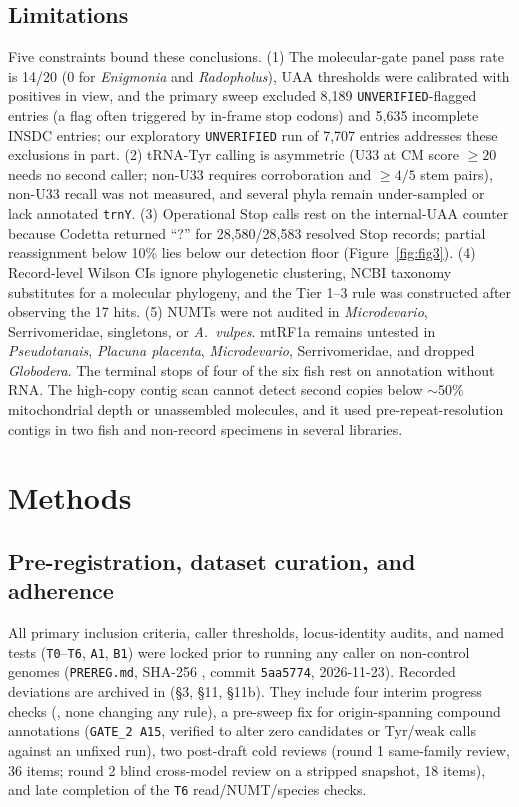 \documentclass[11pt, a4paper]{article}
\begin{document}
\subsection{Limitations}
Five constraints bound these conclusions. (1) The molecular-gate panel pass rate is 14/20 (0 for \textit{Enigmonia} and \textit{Radopholus}), UAA thresholds were calibrated with positives in view, and the primary sweep excluded 8,189 \texttt{UNVERIFIED}-flagged entries (a flag often triggered by in-frame stop codons) and 5,635 incomplete INSDC entries; our exploratory \texttt{UNVERIFIED} run of 7,707 entries addresses these exclusions in part. (2) tRNA-Tyr calling is asymmetric (U33 at CM score $\ge 20$ needs no second caller; non-U33 requires corroboration and $\ge 4/5$ stem pairs), non-U33 recall was not measured, and several phyla remain under-sampled or lack annotated \texttt{trnY}. (3) Operational Stop calls rest on the internal-UAA counter because Codetta returned ``?'' for 28,580/28,583 resolved Stop records; partial reassignment below 10\% lies below our detection floor (Figure~\ref{fig:fig3}). (4) Record-level Wilson CIs ignore phylogenetic clustering, NCBI taxonomy substitutes for a molecular phylogeny, and the Tier 1--3 rule was constructed after observing the 17 hits. (5) NUMTs were not audited in \textit{Microdevario}, Serrivomeridae, singletons, or \textit{A.\ vulpes}. mtRF1a remains untested in \textit{Pseudotanais}, \textit{Placuna placenta}, \textit{Microdevario}, Serrivomeridae, and dropped \textit{Globodera}. The terminal stops of four of the six fish rest on annotation without RNA. The high-copy contig scan cannot detect second copies below $\sim 50\%$ mitochondrial depth or unassembled molecules, and it used pre-repeat-resolution contigs in two fish and non-record specimens in several libraries.

\section{Methods}

\subsection{Pre-registration, dataset curation, and adherence}
All primary inclusion criteria, caller thresholds, locus-identity audits, and named tests (\texttt{T0}--\texttt{T6}, \texttt{A1}, \texttt{B1}) were locked prior to running any caller on non-control genomes (\texttt{PREREG.md}, SHA-256 \texttt{}, commit \texttt{5aa5774}, 2026-11-23). Recorded deviations are archived in  (\S 3, \S 11, \S 11b). They include four interim progress checks (, none changing any rule), a pre-sweep fix for origin-spanning compound annotations (\texttt{GATE\_2 A15}, verified to alter zero candidates or Tyr/weak calls against an unfixed run), two post-draft cold reviews (round 1 same-family review, 36 items; round 2 blind cross-model review on a stripped snapshot, 18 items), and late completion of the \texttt{T6} read/NUMT/species checks.
\end{document}
